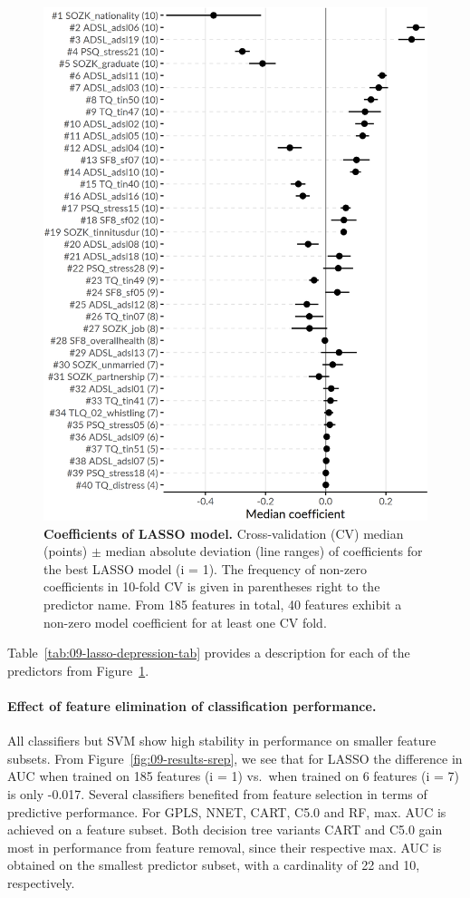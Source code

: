 \documentclass[
  oneside]{book}
\begin{document}
\begin{figure}[h]

{\centering \includegraphics[width=0.643\linewidth]{figures/09-lasso-depression} 

}

\caption{\textbf{Coefficients of LASSO model.} Cross-validation (CV) median (points) \(\pm\) median absolute deviation (line ranges) of coefficients for the best LASSO model (i = 1). The frequency of non-zero coefficients in 10-fold CV is given in parentheses right to the predictor name. From 185 features in total, 40 features exhibit a non-zero model coefficient for at least one CV fold.}\label{fig:09-lasso-depression}
\end{figure}

Table~\ref{tab:09-lasso-depression-tab} provides a description for each of the predictors from Figure~\ref{fig:09-lasso-depression}.

\paragraph*{Effect of feature elimination of classification performance.}

All classifiers but SVM show high stability in performance on smaller feature subsets.
From Figure~\ref{fig:09-results-srep}, we see that for LASSO the difference in AUC when trained on 185 features (i = 1) vs.~when trained on 6 features (i = 7) is only -0.017.
Several classifiers benefited from feature selection in terms of predictive performance.
For GPLS, NNET, CART, C5.0 and RF, max. AUC is achieved on a feature subset.
Both decision tree variants CART and C5.0 gain most in performance from feature removal, since their respective max. AUC is obtained on the smallest predictor subset, with a cardinality of 22 and 10, respectively.
\end{document}
